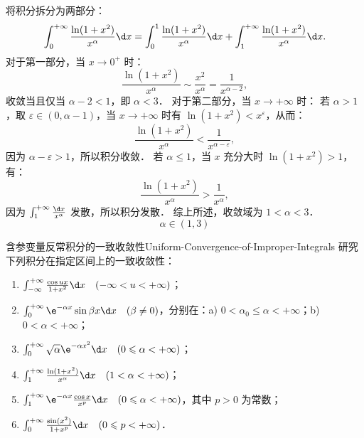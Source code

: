 \begin{solution}

    将积分拆分为两部分：
    \begin{equation}
        \int_0^{+\infty} \frac{\ln(1+x^2)}{x^\alpha} \d x = \int_0^1 \frac{\ln(1+x^2)}{x^\alpha} \d x + \int_1^{+\infty} \frac{\ln(1+x^2)}{x^\alpha} \d x.
    \end{equation}
    对于第一部分，当 $x \to 0^+$ 时：
    \begin{equation}
        \frac{\ln(1+x^2)}{x^\alpha} \sim \frac{x^2}{x^\alpha} = \frac{1}{x^{\alpha-2}},
    \end{equation}
    收敛当且仅当 $\alpha - 2 < 1$，即 $\alpha < 3$．
    对于第二部分，当 $x \to +\infty$ 时：
    若 $\alpha > 1$，取 $\varepsilon \in (0, \alpha-1)$，当 $x \to +\infty$ 时有 $\ln(1+x^2) < x^\varepsilon$，从而：
    \begin{equation}
        \frac{\ln(1+x^2)}{x^\alpha} < \frac{1}{x^{\alpha-\varepsilon}},
    \end{equation}
    因为 $\alpha - \varepsilon > 1$，所以积分收敛．
    若 $\alpha \leqslant 1$，当 $x$ 充分大时 $\ln(1+x^2) > 1$，有：
    \begin{equation}
        \frac{\ln(1+x^2)}{x^\alpha} > \frac{1}{x^\alpha},
    \end{equation}
    因为 $\int_1^{+\infty} \frac{\d x}{x^\alpha}$ 发散，所以积分发散．
    综上所述，收敛域为 $1 < \alpha < 3$．
    \begin{equation}
        \boxed{\alpha \in (1, 3)}
    \end{equation}
\end{solution}

\begin{problem}{含参变量反常积分的一致收敛性}{Uniform-Convergence-of-Improper-Integrals}
    研究下列积分在指定区间上的一致收敛性：
    \begin{enumerate}
        \item $\int_{-\infty}^{+\infty} \frac{\cos ux}{1 + x^2} \d x \quad (-\infty < u < +\infty)$；
        \item $\int_0^{+\infty} \e^{-\alpha x} \sin \beta x \d x \quad (\beta \neq 0)$，分别在：a) $0 < \alpha_0 \leqslant \alpha < +\infty$；b) $0 < \alpha < +\infty$；
        \item $\int_0^{+\infty} \sqrt{\alpha}\e^{-\alpha x^2} \d x \quad (0 \leqslant \alpha < +\infty)$；
        \item $\int_1^{+\infty} \frac{\ln(1 + x^2)}{x^\alpha} \d x \quad (1 < \alpha < +\infty)$；
        \item $\int_1^{+\infty} \e^{-\alpha x} \frac{\cos x}{x^p} \d x \quad (0 \leqslant \alpha < +\infty)$，其中 $p > 0$ 为常数；
        \item $\int_0^{+\infty} \frac{\sin(x^2)}{1 + x^p} \d x \quad (0 \leqslant p < +\infty)$．
    \end{enumerate}
\end{problem}

